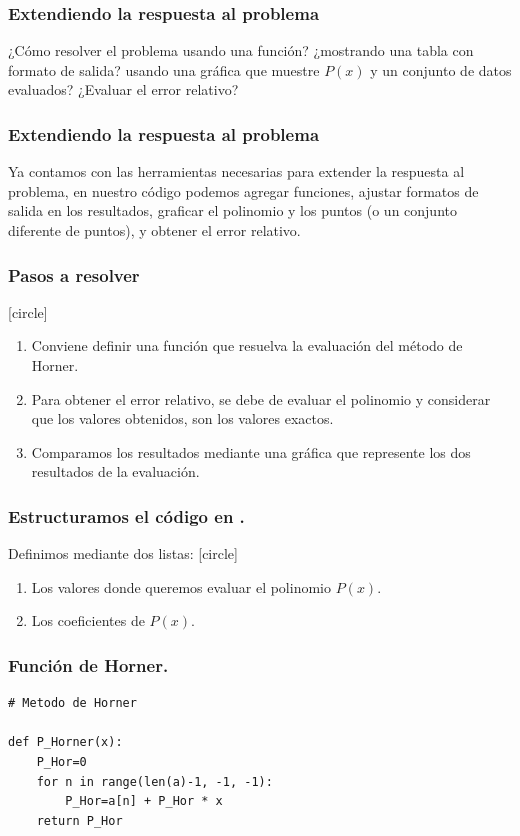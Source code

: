 \begin{frame}
\frametitle{Extendiendo la respuesta al problema}
¿Cómo resolver el problema usando una función? ¿mostrando una tabla con formato de salida? usando una gráfica que muestre $P(x)$ y un conjunto de datos evaluados? ¿Evaluar el error relativo?
\end{frame}
\begin{frame}
\frametitle{Extendiendo la respuesta al problema}
Ya contamos con las herramientas necesarias para extender la respuesta al problema, en nuestro código podemos agregar funciones, ajustar formatos de salida en los resultados, graficar el polinomio y los puntos (o un conjunto diferente de puntos), y obtener el error relativo.
\end{frame}
\begin{frame}
\frametitle{Pasos a resolver}
[circle]
\begin{enumerate}[<+->]
\item Conviene definir una función que resuelva la evaluación del método de Horner.
\item Para obtener el error relativo, se debe de evaluar el polinomio y considerar que los valores obtenidos, son los valores exactos.
\item Comparamos los resultados mediante una gráfica que represente los dos resultados de la evaluación.
\end{enumerate}
\end{frame}
\begin{frame}[fragile]
\frametitle{Estructuramos el código en \python.}
Definimos mediante dos listas:
[circle]
\begin{enumerate}
\item Los valores donde queremos evaluar el polinomio $P(x)$.
\item Los coeficientes de $P(x)$.
\end{enumerate}
\end{frame}
\begin{frame}[fragile]
\frametitle{Función de Horner.}
\fontsize{14}{14}\selectfont
\begin{lstlisting}[caption=Código para la función de Horner, style=codigopython]
# Metodo de Horner

def P_Horner(x):
    P_Hor=0
    for n in range(len(a)-1, -1, -1):     
        P_Hor=a[n] + P_Hor * x
    return P_Hor
\end{lstlisting}
\end{frame}
